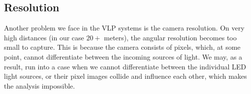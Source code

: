 \subsection{Resolution}
Another problem we face in the \ac{VLP} systems is the camera resolution. On very high distances
(in our case $20 +$ meters), the angular resolution becomes too small to capture.
This is because the camera consists of pixels, which, at some point, cannot differentiate between the incoming sources of light.
We may, as a result, run into a case when we cannot differentiate between the individual \ac{LED} light sources, or their
pixel images collide and influence each other, which makes the analysis impossible.